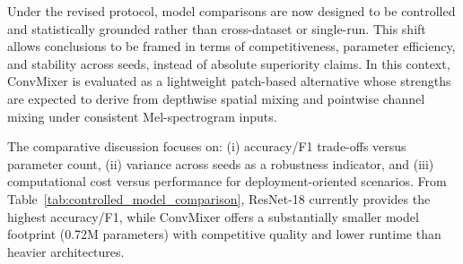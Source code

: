 Under the revised protocol, model comparisons are now designed to be controlled and statistically grounded rather than cross-dataset or single-run. This shift allows conclusions to be framed in terms of competitiveness, parameter efficiency, and stability across seeds, instead of absolute superiority claims. In this context, ConvMixer is evaluated as a lightweight patch-based alternative whose strengths are expected to derive from depthwise spatial mixing and pointwise channel mixing under consistent Mel-spectrogram inputs.

The comparative discussion focuses on: (i) accuracy/F1 trade-offs versus parameter count, (ii) variance across seeds as a robustness indicator, and (iii) computational cost versus performance for deployment-oriented scenarios. From Table~\ref{tab:controlled_model_comparison}, ResNet-18 currently provides the highest accuracy/F1, while ConvMixer offers a substantially smaller model footprint (0.72M parameters) with competitive quality and lower runtime than heavier architectures.
